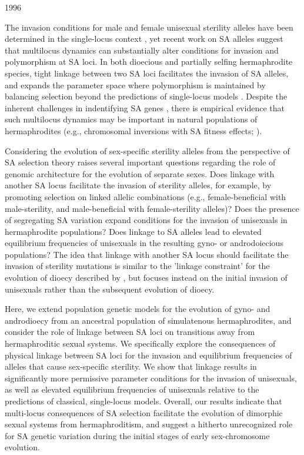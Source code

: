 1996\documentclass[9pt,twocolumn,twoside,lineno]{gsajnl}
\begin{document}
The invasion conditions for male and female unisexual sterility alleles have been determined in the single-locus context \citep{Charlesworth1978a}, yet recent work on SA alleles suggest that multilocus dynamics can substantially alter conditions for invasion and polymorphism at SA loci. In both dioecious and partially selfing hermaphrodite species, tight linkage between two SA loci facilitates the invasion of SA alleles, and expands the parameter space where polymorphism is maintained by balancing selection beyond the predictions of single-locus models \citep{Kidwell1977,Patten2010,UbedaPatten2010,Olito2016}. Despite the inherent challenges in indentifying SA genes \citep{ConnallonClark2012,Barson2015}, there is empirical evidence that such multilocus dynamics may be important in natural populations of hermaphrodites (e.g., chromosomal inversions with SA fitness effects; \citealt{LeeKelly2015}).

Considering the evolution of sex-specific sterility alleles from the perspective of SA selection theory raises several important questions regarding the role of genomic architecture for the evolution of separate sexes. Does linkage with another SA locus facilitate the invasion of sterility alleles, for example, by promoting selection on linked allelic combinations (e.g., female-beneficial with male-sterility, and male-beneficial with female-sterility alleles)? Does the presence of segregating SA variation expand conditions for the invasion of unisexuals in hermaphrodite populations? Does linkage to SA alleles lead to elevated equilibrium frequencies of unisexuals in the resulting gyno- or androdoiecious populations? The idea that linkage with another SA locus should facilitate the invasion of sterility mutations is similar to the 'linkage constraint' for the evolution of dioecy described by \citet{Charlesworth1978a}, but focuses instead on the initial invasion of unisexuals rather than the subsequent evolution of dioecy. 

Here, we extend population genetic models for the evolution of gyno- and androdioecy from an ancestral population of simulatenous hermaphrodites, and consider the role of linkage between SA loci on transitions away from hermaphroditic sexual systems. We specifically explore the consequences of physical linkage between SA loci for the invasion and equilibrium frequencies of alleles that cause sex-specific sterility. We show that linkage results in significantly more permissive parameter conditions for the invasion of unisexuals, as well as elevated equilibrium frequencies of unisexuals relative to the predictions of classical, single-locus models. Overall, our results indicate that multi-locus consequences of SA selection facilitate the evolution of dimorphic sexual systems from hermaphroditism, and suggest a hitherto unrecognized role for SA genetic variation during the initial stages of early sex-chromosome evolution.
\end{document}
